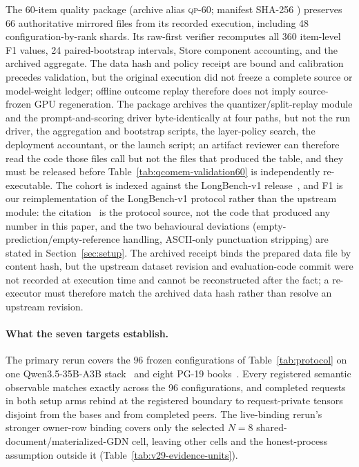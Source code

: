 \documentclass{article}
\begin{document}
The 60-item quality package (archive alias \textsc{qp-60}; manifest SHA-256
)
preserves 66 authoritative mirrored files from its recorded execution,
including 48 configuration-by-rank shards.  Its
raw-first verifier recomputes all 360 item-level F1 values, 24 paired-bootstrap
intervals, Store component accounting, and the archived aggregate.  The data
hash and policy receipt are bound and calibration precedes validation, but the
original execution did not freeze a complete source or model-weight ledger;
offline outcome replay therefore does not imply source-frozen GPU
regeneration.  The package archives the quantizer/split-replay module and the
prompt-and-scoring driver byte-identically at four paths, but not the run
driver, the aggregation and bootstrap scripts, the layer-policy search, the
deployment accountant, or the launch script; an artifact reviewer can therefore
read the code those files call but not the files that produced the table, and
they must be released before Table~\ref{tab:qcomem-validation60} is
independently re-executable.  The cohort is indexed against the LongBench-v1
release~\citep{bai2024longbenchrelease}, and F1 is our reimplementation of the
LongBench-v1  protocol rather than the upstream module: the
citation~\citep{bai2024longbenchcode} is the protocol source, not the code that
produced any number in this paper, and the two behavioural deviations
(empty-prediction/empty-reference handling, ASCII-only punctuation stripping)
are stated in Section~\ref{sec:setup}.  The
archived receipt binds the prepared data file by content hash, but the upstream
dataset revision and evaluation-code commit were not recorded at execution time
and cannot be reconstructed after the fact; a re-executor must therefore match
the archived data hash rather than resolve an upstream revision.

\paragraph{What the seven targets establish.}
The primary rerun covers the $96$ frozen configurations of
Table~\ref{tab:protocol} on one
Qwen3.5-35B-A3B stack~\citep{qwen2026qwen35,qwen2026qwen35modelcard} and eight
PG-19 books~\citep{rae2020compressive}.
Every registered semantic observable matches exactly across the 96
configurations, and completed requests in both setup arms rebind at the
registered boundary to request-private tensors disjoint from the bases and from
completed peers.  The live-binding rerun's stronger owner-row binding covers only
the selected $N=8$ shared-document/materialized-GDN cell, leaving other cells and
the honest-process assumption outside it (Table~\ref{tab:v29-evidence-units}).
\end{document}
